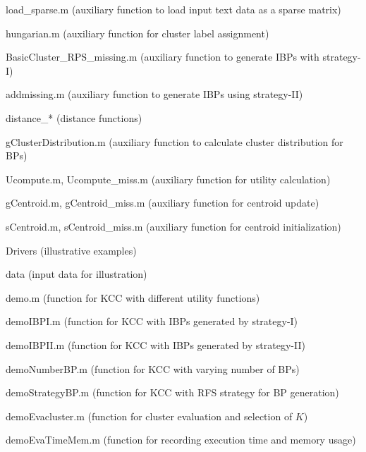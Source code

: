 \documentclass[10pt]{acmtrans2e}
\begin{document}
\begin{compactitem}
\begin{compactitem}
   \item \textsf{load\_sparse.m} (auxiliary function to load input text data as a sparse matrix)
   \item \textsf{hungarian.m} (auxiliary function for cluster label assignment)
   \item \textsf{BasicCluster\_RPS\_missing.m} (auxiliary function to generate IBPs with strategy-I)
   \item \textsf{addmissing.m} (auxiliary function to generate IBPs using strategy-II)
   \item \textsf{distance\_*} (distance functions)
   \item \textsf{gClusterDistribution.m} (auxiliary function to calculate cluster distribution for BPs)
   \item \textsf{Ucompute.m, Ucompute\_miss.m} (auxiliary function for utility calculation)
   \item \textsf{gCentroid.m, gCentroid\_miss.m} (auxiliary function for centroid update)
   \item \textsf{sCentroid.m, sCentroid\_miss.m} (auxiliary function for centroid initialization)
  \end{compactitem}
  \item \textsf{Drivers} (illustrative examples)
  \begin{compactitem}
   \item \textsf{data} (input data for illustration)
   \item \textsf{demo.m} (function for KCC with different utility functions)
   \item \textsf{demoIBPI.m} (function for KCC with IBPs generated by strategy-I)
   \item \textsf{demoIBPII.m} (function for KCC with IBPs generated by strategy-II)
   \item \textsf{demoNumberBP.m} (function for KCC with varying number of BPs)
   \item \textsf{demoStrategyBP.m} (function for KCC with RFS strategy for BP generation)
   \item \textsf{demoEvacluster.m} (function for cluster evaluation and selection of $K$)
   \item \textsf{demoEvaTimeMem.m} (function for recording execution time and memory usage)
  \end{compactitem}
\end{compactitem}
\end{document}
